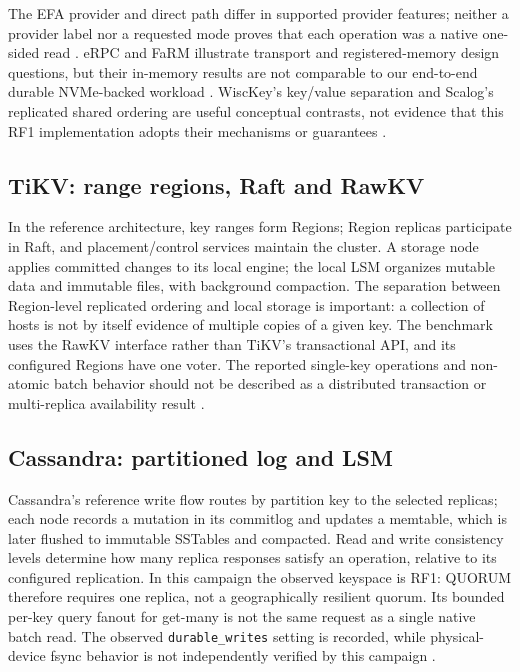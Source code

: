 \documentclass[11pt,a4paper]{article}
\begin{document}
The EFA provider and direct path differ in supported provider features; neither a provider label nor a requested mode proves that each operation was a native one-sided read \cite{awsefa,libfabricefa}. eRPC and FaRM illustrate transport and registered-memory design questions, but their in-memory results are not comparable to our end-to-end durable NVMe-backed workload \cite{erpc2019,farm2014}. WiscKey's key/value separation and Scalog's replicated shared ordering are useful conceptual contrasts, not evidence that this RF1 implementation adopts their mechanisms or guarantees \cite{wisckey2016,scalog2020}.

\subsection{TiKV: range regions, Raft and RawKV}
In the reference architecture, key ranges form Regions; Region replicas participate in Raft, and placement/control services maintain the cluster. A storage node applies committed changes to its local engine; the local LSM organizes mutable data and immutable files, with background compaction. The separation between Region-level replicated ordering and local storage is important: a collection of hosts is not by itself evidence of multiple copies of a given key. The benchmark uses the RawKV interface rather than TiKV's transactional API, and its configured Regions have one voter. The reported single-key operations and non-atomic batch behavior should not be described as a distributed transaction or multi-replica availability result \cite{tikvstorage,tikvwrite854}.

\subsection{Cassandra: partitioned log and LSM}
Cassandra's reference write flow routes by partition key to the selected replicas; each node records a mutation in its commitlog and updates a memtable, which is later flushed to immutable SSTables and compacted. Read and write consistency levels determine how many replica responses satisfy an operation, relative to its configured replication. In this campaign the observed keyspace is RF1: QUORUM therefore requires one replica, not a geographically resilient quorum. Its bounded per-key query fanout for get-many is not the same request as a single native batch read. The observed \texttt{durable\_writes} setting is recorded, while physical-device fsync behavior is not independently verified by this campaign \cite{cassandraengine,cassandraconfig509}.
\end{document}
